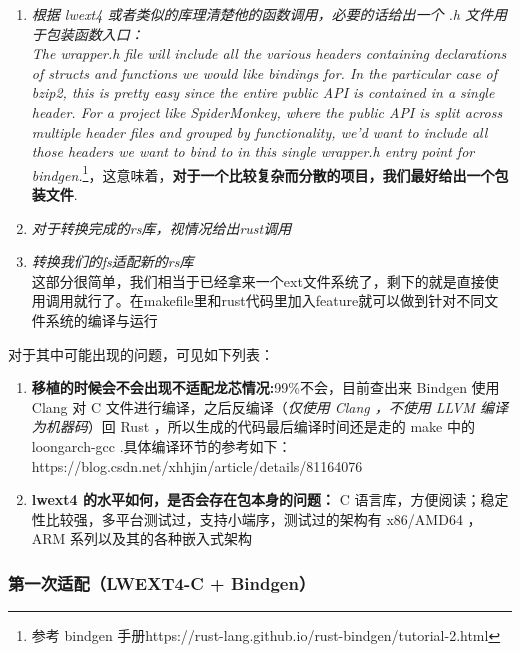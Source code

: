 \begin{enumerate}
    \item \textit{根据 lwext4 或者类似的库理清楚他的函数调用，必要的话给出一个 .h 文件用于包装函数入口：} \\ \textit{The wrapper.h file will include all the various headers containing declarations of structs and functions we would like bindings for. In the particular case of bzip2, this is pretty easy since the entire public API is contained in a single header. For a project like SpiderMonkey, where the public API is split across multiple header files and grouped by functionality, we'd want to include all those headers we want to bind to in this single wrapper.h entry point for bindgen.}\footnote{参考 bindgen 手册https://rust-lang.github.io/rust-bindgen/tutorial-2.html}，这意味着，\textbf{对于一个比较复杂而分散的项目，我们最好给出一个包装文件}.
    \item \textit{对于转换完成的rs库，视情况给出rust调用}
    \item \textit{转换我们的fs适配新的rs库} \\ 这部分很简单，我们相当于已经拿来一个ext文件系统了，剩下的就是直接使用调用就行了。在makefile里和rust代码里加入feature就可以做到针对不同文件系统的编译与运行
\end{enumerate}

\vspace{1em}

对于其中可能出现的问题，可见如下列表：

\begin{enumerate}
    \item \textbf{移植的时候会不会出现不适配龙芯情况:}99\%不会，目前查出来 Bindgen 使用 Clang 对 C 文件进行编译，之后反编译（\textit{仅使用 Clang ，不使用 LLVM 编译为机器码}）回 Rust ，所以生成的代码最后编译时间还是走的 make 中的 loongarch-gcc .具体编译环节的参考如下：https://blog.csdn.net/xhhjin/article/details/81164076
    \item \textbf{lwext4 的水平如何，是否会存在包本身的问题：} C 语言库，方便阅读；稳定性比较强，多平台测试过，支持小端序，测试过的架构有 x86/AMD64 ， ARM 系列以及其的各种嵌入式架构
\end{enumerate}

\subsubsection{第一次适配（LWEXT4-C + Bindgen）}

